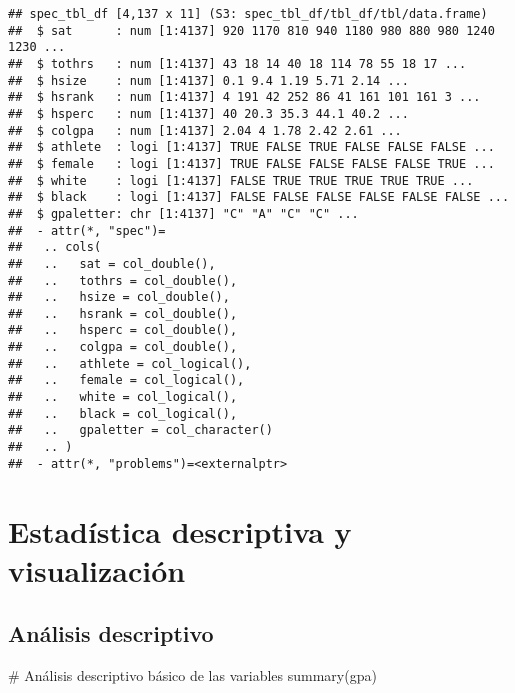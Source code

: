 \documentclass[
]{article}
\newenvironment{Shaded}{\begin{snugshade}}{\end{snugshade}}
\newcommand{\CommentTok}[1]{\textcolor[rgb]{0.50,0.62,0.50}{#1}}
\newcommand{\FunctionTok}[1]{\textcolor[rgb]{0.94,0.94,0.56}{#1}}
\newcommand{\NormalTok}[1]{\textcolor[rgb]{0.80,0.80,0.80}{#1}}
\begin{document}
\begin{verbatim}
## spec_tbl_df [4,137 x 11] (S3: spec_tbl_df/tbl_df/tbl/data.frame)
##  $ sat      : num [1:4137] 920 1170 810 940 1180 980 880 980 1240 1230 ...
##  $ tothrs   : num [1:4137] 43 18 14 40 18 114 78 55 18 17 ...
##  $ hsize    : num [1:4137] 0.1 9.4 1.19 5.71 2.14 ...
##  $ hsrank   : num [1:4137] 4 191 42 252 86 41 161 101 161 3 ...
##  $ hsperc   : num [1:4137] 40 20.3 35.3 44.1 40.2 ...
##  $ colgpa   : num [1:4137] 2.04 4 1.78 2.42 2.61 ...
##  $ athlete  : logi [1:4137] TRUE FALSE TRUE FALSE FALSE FALSE ...
##  $ female   : logi [1:4137] TRUE FALSE FALSE FALSE FALSE TRUE ...
##  $ white    : logi [1:4137] FALSE TRUE TRUE TRUE TRUE TRUE ...
##  $ black    : logi [1:4137] FALSE FALSE FALSE FALSE FALSE FALSE ...
##  $ gpaletter: chr [1:4137] "C" "A" "C" "C" ...
##  - attr(*, "spec")=
##   .. cols(
##   ..   sat = col_double(),
##   ..   tothrs = col_double(),
##   ..   hsize = col_double(),
##   ..   hsrank = col_double(),
##   ..   hsperc = col_double(),
##   ..   colgpa = col_double(),
##   ..   athlete = col_logical(),
##   ..   female = col_logical(),
##   ..   white = col_logical(),
##   ..   black = col_logical(),
##   ..   gpaletter = col_character()
##   .. )
##  - attr(*, "problems")=<externalptr>
\end{verbatim}

\hypertarget{estaduxedstica-descriptiva-y-visualizaciuxf3n}{%
\section{Estadística descriptiva y
visualización}\label{estaduxedstica-descriptiva-y-visualizaciuxf3n}}

\hypertarget{anuxe1lisis-descriptivo}{%
\subsection{Análisis descriptivo}\label{anuxe1lisis-descriptivo}}

\begin{Shaded}
\begin{Highlighting}[]
\CommentTok{\# Análisis descriptivo básico de las variables}
\FunctionTok{summary}\NormalTok{(gpa)}
\end{Highlighting}
\end{Shaded}
\end{document}
